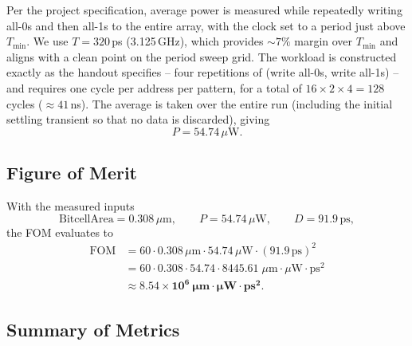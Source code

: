 \documentclass[11pt,letterpaper]{article}
\newcommand{\um}{\ensuremath{\,\mu\text{m}}}
\newcommand{\uW}{\ensuremath{\,\mu\text{W}}}
\begin{document}
Per the project specification, average power is measured while repeatedly
writing all-0s and then all-1s to the entire array, with the clock set to
a period just above $T_{\min}$. We use $T=320$\,ps (3.125\,GHz), which
provides $\sim7\%$ margin over $T_{\min}$ and aligns with a clean point on
the period sweep grid. The workload is constructed exactly as the handout
specifies -- four repetitions of (write all-0s, write all-1s) -- and
requires one cycle per address per pattern, for a total of
$16\times 2\times 4 = 128$ cycles ($\approx 41\,$ns). The average is taken
over the entire run (including the initial settling transient so that no
data is discarded), giving
\[
  P = 54.74\uW.
\]

\subsection{Figure of Merit}
\label{sec:fom}

With the measured inputs
\[
  \mathrm{BitcellArea} = 0.308\um,\qquad
  P = 54.74\uW,\qquad
  D = 91.9\,\text{ps},
\]
the FOM evaluates to
\begin{align*}
  \mathrm{FOM}
  &= 60 \cdot 0.308\um \cdot 54.74\uW \cdot (91.9\,\text{ps})^2 \\
  &= 60 \cdot 0.308 \cdot 54.74 \cdot 8445.61
     \;\mu\text{m}\cdot\mu\text{W}\cdot\text{ps}^{2} \\
  &\approx \mathbf{8.54\times10^{6}\ \mu\text{m}\cdot\mu\text{W}\cdot\text{ps}^{2}}.
\end{align*}

\subsection{Summary of Metrics}
\end{document}
